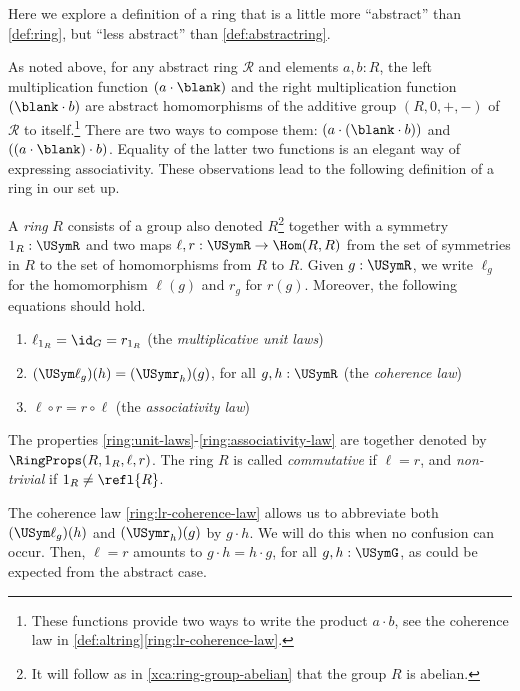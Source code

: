 Here we explore a definition of a ring that is
a little more ``abstract'' than \cref{def:ring},
but ``less abstract'' than \cref{def:abstractring}.

As noted above, for any abstract ring $\mathscr R$ and elements $a,b:R$,
the left multiplication function $(a\cdot\blank)$ 
and the right multiplication function $(\blank\cdot b)$ are
abstract homomorphisms
of the additive group $(R,0,+,-)$ of $\mathscr R$ to itself.\footnote{%
    These functions provide two ways to write the product $a\cdot b$,
see the coherence law in \cref{def:altring}\ref{ring:lr-coherence-law}.}
There are two ways to compose them: $(a\cdot(\blank\cdot b))$
and $((a\cdot\blank)\cdot b)$. Equality of the latter two functions is
an elegant way of expressing associativity.
These observations lead to the following definition of a 
ring in our set up.

\begin{definition}\label{def:altring}
A \emph{ring} $R$ consists of a group also denoted $R$\footnote{%
It will follow as in \cref{xca:ring-group-abelian} that the group $R$
is abelian.} together with
a symmetry $1_R : \USymR$ and two maps $\ell,r: \USymR\to\Hom(R,R)$
from the set of symmetries in $R$ to the set of homomorphisms from
$R$ to $R$.
Given $g:\USymR$, we write $\ell_g$ for the homomorphism $\ell(g)$ and 
$r_g$ for $r(g)$.
Moreover, the following equations should hold.
    \begin{enumerate}
    \item\label{ring:unit-laws} $\ell_{1_R} = \id_G = r_{1_R}$ (the \emph{multiplicative unit laws})
    \item\label{ring:lr-coherence-law} $(\USym\ell_g)(h) = (\USymr_h)(g)$, 
    for all $g,h : \USymR$ (the \emph{coherence law})
        \item\label{ring:associativity-law} $\ell\circ r= r\circ\ell$ (the \emph{associativity law})
    \end{enumerate}
The properties \ref{ring:unit-laws}-\ref{ring:associativity-law} 
are together denoted by $\RingProps(R,1_R,\ell,r)$.
The ring $R$ is called \emph{commutative} if $\ell=r$,
and \emph{non-trivial} if $1_R \neq \refl{R}$.
\end{definition}

The coherence law \ref{ring:lr-coherence-law} allows us to abbreviate both 
$(\USym\ell_g)(h)$ and $(\USymr_h)(g)$ by $g\cdot h$. We will do this when
no confusion can occur. Then, $\ell=r$ 
amounts to $g\cdot h = h\cdot g$, for all $g,h : \USymG$,
as could be expected from the abstract case.

